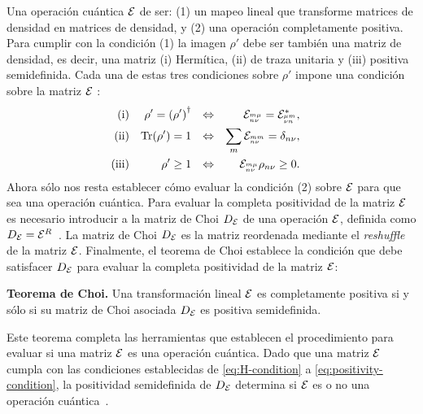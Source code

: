 Una operación cuántica $\mathcal{E}$ de ser: (1) un mapeo lineal que
transforme matrices de densidad en matrices de densidad, y (2) una 
operación completamente positiva. 
Para cumplir con la condición (1) la imagen $\rho'$ debe ser también 
una matriz de densidad, es decir, una matriz (i) Hermítica, 
(ii) de traza unitaria y (iii) positiva semidefinida. 
Cada una de estas tres condiciones sobre $\rho'$ impone una condición 
sobre la matriz $\mathcal{E}$ \cite{bengtsson_zyczkowski_2017}:
\begin{align}
\text{(i)}&& \rho'=\qty(\rho')^{\dagger}&&\Leftrightarrow
    && \mathcal{E}_{{}^{m\mu}_{n\nu}}=\mathcal{E}_{{}^{\mu m}_{\nu n}}^*,&&
    \label{eq:H-condition}\\
\text{(ii)}&&\Tr(\rho')=1
    &&\Leftrightarrow&&  \sum_{m}\mathcal{E}_{{}^{mm}_{n\nu}}=\delta_{n\nu},\\     
\text{(iii)}&&\rho'\geq1
    &&\Leftrightarrow&&  \mathcal{E}_{{}^{m\mu}_{n\nu}}\rho_{n\nu}\geq0.
    \label{eq:positivity-condition}
\end{align}
Ahora sólo nos resta establecer cómo evaluar la condición (2) sobre $\mathcal{E}$
para que sea una operación cuántica. 
Para evaluar la completa positividad de la matriz $\mathcal{E}$
es necesario introducir a la matriz de Choi $D_{\mathcal{E}}$ 
de una operación $\mathcal{E}$, definida como 
$D_{\mathcal{E}}=\mathcal{E}^{R}$~\cite{bengtsson_zyczkowski_2017}.
La matriz de Choi $D_{\mathcal{E}}$ es la matriz reordenada mediante
el \textit{reshuffle} de la matriz $\mathcal{E}$. 
Finalmente, el teorema de Choi \cite{bengtsson_zyczkowski_2017}
establece la condición que debe satisfacer $D_{\mathcal{E}}$ para 
evaluar la completa positividad de la matriz $\mathcal{E}$:
\begin{teorema}{\textbf{Teorema de Choi.}}
Una transformación lineal $\mathcal{E}$ es completamente positiva si y sólo si 
su matriz de Choi asociada $D_{\mathcal{E}}$ es positiva semidefinida.
\end{teorema}
Este teorema completa las herramientas que establecen el procedimiento 
para evaluar si una matriz $\mathcal{E}$ es una operación cuántica. 
Dado que una matriz $\mathcal{E}$ cumpla con las condiciones establecidas de
\eqref{eq:H-condition} a \eqref{eq:positivity-condition}, la positividad
semidefinida de $D_{\mathcal{E}}$ determina si $\mathcal{E}$ es 
o no una operación cuántica~\cite{bengtsson_zyczkowski_2017}.
 

